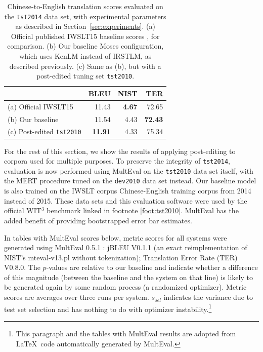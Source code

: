 {%
\begin{table}[ht]
\centering
\begin{tabular}{|l|r|r|r|}
\hline
                    & BLEU  & NIST & TER    \\ \hline
(a) Official IWSLT15    & 11.43 & \textbf{4.67} & 72.65  \\ \hline
(b) Our baseline        & 11.54 & 4.43 & \textbf{72.43} \\ \hline
(c) Post-edited {\small \tt tst2010} & \textbf{11.91} & 4.33 & 75.34 \\ \hline
\end{tabular}

\caption{ \label{tab:tst2010}
    Chinese-to-English translation scores evaluated on the {\small \tt tst2014} data set, with experimental parameters as described in Section~\ref{sec:experiments}. 
    (a) Official published IWSLT15 baseline scores , for comparison.
    (b) Our baseline Moses configuration, which uses KenLM instead of IRSTLM, as described previously.
    (c) Same as (b), but with a post-edited tuning set {\small \tt tst2010}. 
} %
\end{table}

For the rest of this section, we show the results of applying post-editing to corpora used for multiple purposes.
To preserve the integrity of {\small \tt tst2014}, evaluation is now performed using MultEval  on the {\small \tt tst2010} data set itself, with the MERT procedure tuned on the {\small \tt dev2010} data set instead.
Our baseline model is also trained on the IWSLT corpus Chinese-English training corpus from 2014 instead of 2015.
These data sets and this evaluation software were used by the official WIT$^3$ benchmark linked in footnote \ref{foot:tst2010}.
MultEval has the added benefit of providing bootstrapped error bar estimates.

In tables with MultEval scores below, metric scores for all systems were generated using MultEval 0.5.1 : jBLEU V0.1.1 (an exact reimplementation of NIST's mteval-v13.pl without tokenization); Translation Error Rate (TER) V0.8.0. 
The $p$-values are relative to our baseline and indicate whether a difference of this magnitude (between the baseline and the system on that line) is likely to be generated again by some random process (a randomized optimizer). 
Metric scores are averages over three runs per system. 
$s_{sel}$ indicates the variance due to test set selection and has nothing to do with optimizer instability.\footnote{
    This paragraph and the tables with MultEval results are adopted from \LaTeX~code automatically generated by MultEval.
}





}
